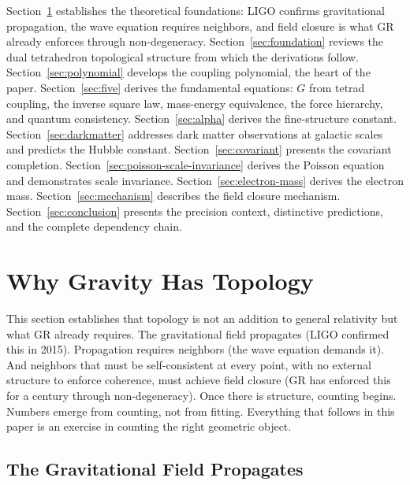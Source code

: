 \documentclass[aps,prd,preprint,superscriptaddress,showpacs,preprintnumbers,amsmath,amssymb,nofootinbib]{revtex4-2}
\begin{document}
Section~\ref{sec:theory} establishes the theoretical foundations: LIGO confirms gravitational propagation, the wave equation requires neighbors, and field closure is what GR already enforces through non-degeneracy. Section~\ref{sec:foundation} reviews the dual tetrahedron topological structure from which the derivations follow. Section~\ref{sec:polynomial} develops the coupling polynomial, the heart of the paper. Section~\ref{sec:five} derives the fundamental equations: $G$ from tetrad coupling, the inverse square law, mass-energy equivalence, the force hierarchy, and quantum consistency. Section~\ref{sec:alpha} derives the fine-structure constant. Section~\ref{sec:darkmatter} addresses dark matter observations at galactic scales and predicts the Hubble constant. Section~\ref{sec:covariant} presents the covariant completion. Section~\ref{sec:poisson-scale-invariance} derives the Poisson equation and demonstrates scale invariance. Section~\ref{sec:electron-mass} derives the electron mass. Section~\ref{sec:mechanism} describes the field closure mechanism. Section~\ref{sec:conclusion} presents the precision context, distinctive predictions, and the complete dependency chain.

\section{Why Gravity Has Topology}
\label{sec:theory}

This section establishes that topology is not an addition to general relativity but what GR already requires. The gravitational field propagates (LIGO confirmed this in 2015). Propagation requires neighbors (the wave equation demands it). And neighbors that must be self-consistent at every point, with no external structure to enforce coherence, must achieve field closure (GR has enforced this for a century through non-degeneracy). Once there is structure, counting begins. Numbers emerge from counting, not from fitting. Everything that follows in this paper is an exercise in counting the right geometric object.

\subsection{The Gravitational Field Propagates}
\label{subsec:propagates}
\end{document}
